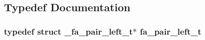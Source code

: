 \subsection{Typedef Documentation}
\hypertarget{group___fa_pair_left_ga3d01023403cd976e31ce70c510fcf2be}{
\subsubsection[{fa\-\_\-pair\-\_\-left\-\_\-t}]{\setlength{\rightskip}{0pt plus 5cm}typedef struct \-\_\-fa\-\_\-pair\-\_\-left\-\_\-t$\ast$ {\bf fa\-\_\-pair\-\_\-left\-\_\-t}}}\label{group___fa_pair_left_ga3d01023403cd976e31ce70c510fcf2be}


